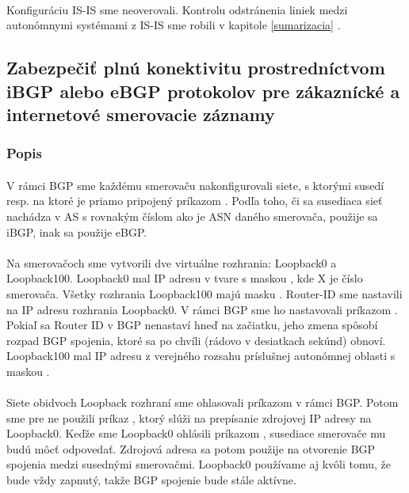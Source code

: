 \documentclass[12pt,twoside,a4paper]{report}
\begin{document}
\paragraph{}
Konfiguráciu IS-IS sme neoverovali. Kontrolu odstránenia liniek medzi autonómnymi systémami z IS-IS sme robili v kapitole \ref{sumarizacia} .






\subsection{Zabezpečiť plnú konektivitu prostredníctvom iBGP alebo eBGP protokolov pre zákaznícké a internetové smerovacie záznamy}
\subsubsection{Popis}
\paragraph{}
V rámci BGP sme každému smerovaču nakonfigurovali siete, s ktorými susedí resp. na ktoré je priamo pripojený príkazom . Podľa toho, či sa susediaca sieť nachádza v AS s rovnakým číslom ako je ASN daného smerovača, použije sa iBGP, inak sa použije eBGP. 

\paragraph{}
Na smerovačoch sme vytvorili dve virtuálne rozhrania: Loopback0 a Loopback100. Loopback0 mal IP adresu v tvare  s maskou , kde X je číslo smerovača. Všetky rozhrania Loopback100 majú masku . Router-ID sme nastavili na IP adresu rozhrania Loopback0. V rámci BGP sme ho nastavovali príkazom . Pokiaľ sa Router ID v BGP nenastaví hneď na začiatku, jeho zmena spôsobí rozpad BGP spojenia, ktoré sa po chvíli (rádovo v desiatkach sekúnd) obnoví. Loopback100 mal IP adresu z verejného rozsahu príslušnej autonómnej oblasti s maskou .

\paragraph{}
Siete obidvoch Loopback rozhraní sme ohlasovali príkazom  v rámci BGP. Potom sme pre ne použili príkaz , ktorý slúži na prepísanie zdrojovej IP adresy na Loopback0. Keďže sme Loopback0 ohlásili príkazom , susediace smerovače mu budú môcť odpovedať. Zdrojová adresa sa potom použije na otvorenie BGP spojenia medzi susednými smerovačmi. Loopback0 používame aj kvôli tomu, že bude vždy zapnutý, takže BGP spojenie bude stále aktívne.
\end{document}
